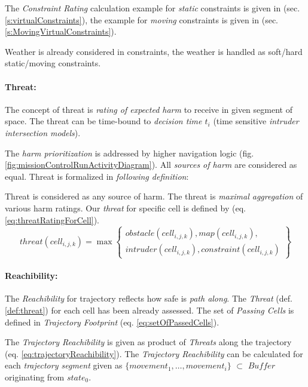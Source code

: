 \noindent The \emph{Constraint Rating} calculation example for \emph{static} constraints is given in (sec. \ref{s:virtualConstraints}), the example for \emph{moving} constraints is given in (sec. \ref{s:MovingVirtualConstraints}).

\begin{note}{Weather}
    is already considered in constraints, the weather is handled as soft/hard static/moving constraints.
\end{note}

\paragraph{Threat:} The concept of threat is \emph{rating of expected harm} to receive in given segment of space. The threat can be time-bound to \emph{decision time $t_i$} (time sensitive \emph{intruder intersection models}).

The \emph{harm prioritization} is addressed by higher navigation logic (fig. \ref{fig:missionControlRunActivityDiagram}). All \emph{sources of harm} are considered as equal. Threat is formalized in \emph{following definition}:

\begin{definition}{Threat}\label{def:threat} is considered as any source of harm. The threat is \emph{maximal aggregation} of various harm ratings. Our \emph{threat} for specific cell is defined by (eq. \ref{eq:threatRatingForCell}).
    \begin{equation}\label{eq:threatRatingForCell}
        threat(cell_{i,j,k}) = \max\left\{\begin{gathered}obstacle(cell_{i,j,k}),map(cell_{i,j,k}),\\intruder(cell_{i,j,k}),constraint(cell_{i,j,k})\end{gathered}\right\}
    \end{equation}
\end{definition}

\paragraph{Reachibility:} The \emph{Reachibility} for trajectory reflects how safe is \emph{path along}. The \emph{Threat} (def. \ref{def:threat}) for each cell has been already assessed.  The set of \emph{Passing Cells} is defined in \emph{Trajectory Footprint} (eq. \ref{eq:setOfPassedCells}).

The \emph{Trajectory Reachibility} is given as product of \emph{Threats} along the trajectory (eq. \ref{eq:trajectoryReachibility}). The \emph{Trajectory Reachibility} can be calculated for each \emph{trajectory segment} given as $\{movement_1,\dots,movement_i\}$ $\subset$ $Buffer$ originating from $state_0$.


